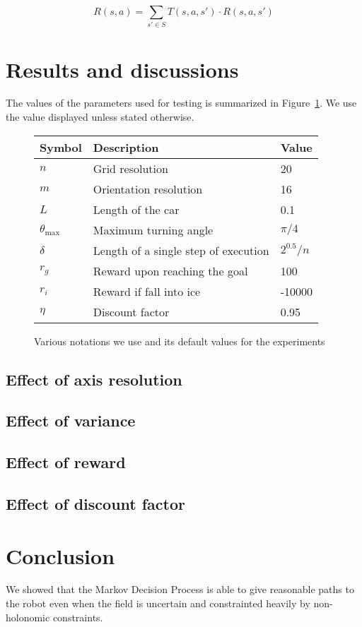 \documentclass[a4paper]{article}
\begin{document}
\[ R(s, a) = \sum_{s' \in S} T(s, a, s') \cdot R(s, a, s') \]

\section{Results and discussions}

The values of the parameters used for testing is summarized in Figure~\ref{f:notations}.
We use the value displayed unless stated otherwise.

\begin{figure}
\label{f:notations}
\caption{Various notations we use and its default values for the experiments}
\begin{tabular}{ l | l | l }
  Symbol & Description & Value \\ \hline \hline
  $n$ & Grid resolution & 20 \\ \hline
  $m$ & Orientation resolution & 16 \\ \hline
  $L$ & Length of the car & 0.1 \\ \hline
  $\theta_{\text{max}}$ & Maximum turning angle & $\pi / 4$ \\ \hline
  $\delta$ & Length of a single step of execution & $2^{0.5} / n$ \\ \hline
  $r_g$ & Reward upon reaching the goal & 100 \\ \hline
  $r_i$ & Reward if fall into ice & -10000 \\ \hline
  $\eta$ & Discount factor & 0.95 \\ \hline
\end{tabular}
\end{figure}

\subsection{Effect of axis resolution}

\subsection{Effect of variance}

\subsection{Effect of reward}

\subsection{Effect of discount factor}

\section{Conclusion}
We showed that the Markov Decision Process is able to give reasonable paths
to the robot even when the field is uncertain and constrainted heavily by
non-holonomic constraints.
\end{document}
